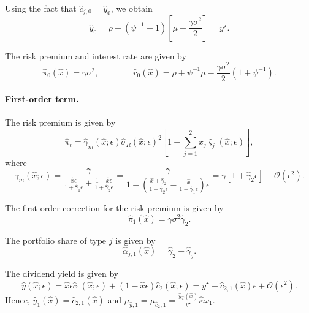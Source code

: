 \documentclass[11pt,english]{article}
\begin{document}
Using the fact that $\hat{c}_{j,0} = \hat{y}_0$, we obtain
\begin{equation}
    \hat{y}_0 = \rho + (\psi^{-1}-1) \left[ \mu - \frac{\gamma \sigma^2}{2}\right] = y^\star.
\end{equation}

The risk premium and interest rate are given by
\begin{equation}
    \hat{\pi}_0(\hat{x}) = \gamma \sigma^2, \qquad \qquad 
    \hat{r}_0(\hat{x}) = \rho + \psi^{-1} \mu - \frac{\gamma \sigma^2}{2} (1+\psi^{-1}).
\end{equation}

\paragraph{First-order term.} The risk premium is given by
\begin{equation}
    \hat{\pi}_t = \hat{\gamma}_m(\hat{x};\epsilon) \hat{\sigma}_R(\hat{x};\epsilon)^2 \left[ 1 - \sum_{j=1}^2 x_j \hat{\varsigma}_{j}(\hat{x};\epsilon)\right],
\end{equation}
where
\begin{equation}
    \hat{\gamma}_m(\hat{x};\epsilon) = \frac{\gamma}{\frac{\hat{x}\epsilon}{1+\hat{\gamma}_1\epsilon} +\frac{1-\hat{x}\epsilon}{1+\hat{\gamma}_2 \epsilon}} = \frac{\gamma}{1 - \left(\frac{\hat{x} +\hat{\gamma}_2}{1+\hat{\gamma}_2 \epsilon}-\frac{\hat{x}}{1+\hat{\gamma}_1\epsilon}\right)\epsilon } = \gamma \left[1 + \hat{\gamma}_2\epsilon \right] +\mathcal{O}(\epsilon^2).
\end{equation}

The first-order correction for the risk premium is given by
\begin{equation}
    \hat{\pi}_{1}(\hat{x}) = \gamma \sigma^2 \hat{\gamma}_2.
\end{equation}

The portfolio share of type $j$ is given by
\begin{equation}
    \hat{\alpha}_{j,1}(\hat{x}) = \hat{\gamma}_2 - \hat{\gamma}_j.
\end{equation}

The dividend yield is given by
\begin{equation}
    \hat{y}(\hat{x};\epsilon) = \hat{x} \epsilon \hat{c}_{1}(\hat{x};\epsilon) +(1-\hat{x}\epsilon) \hat{c}_{2}(\hat{x};\epsilon) = y^\star +\hat{c}_{2,1}(\hat{x})\epsilon+\mathcal{O}(\epsilon^2).
\end{equation}
Hence, $\hat{y}_1(\hat{x}) = \hat{c}_{2,1}(\hat{x})$ and $\mu_{\hat{y},1} = \mu_{\hat{c}_2,1} = \frac{\hat{y}_{\hat{x}}(\hat{x})}{y^\star} \hat{\kappa} \omega_1$.
\end{document}
